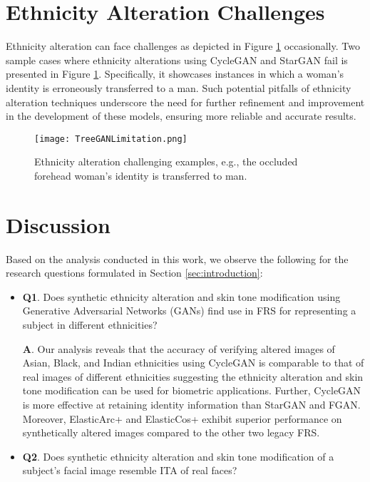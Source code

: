 {	



		

 

  

		



\section{Ethnicity Alteration Challenges}\label{sec:challenges}
Ethnicity alteration can face challenges as depicted in Figure \ref{fig:treeganlimitation} occasionally. Two sample cases where ethnicity alterations using CycleGAN and StarGAN fail is presented in Figure \ref{fig:treeganlimitation}. Specifically, it showcases instances in which a woman's identity is erroneously transferred to a man. Such potential pitfalls of ethnicity alteration techniques underscore the need for further refinement and improvement in the development of these models, ensuring more reliable and accurate results.

   
\begin{figure}[htp]
    \centering
    \texttt{[image: TreeGANLimitation.png]}
    \caption{Ethnicity alteration challenging examples, e.g., the occluded forehead woman’s identity is transferred to man.}
    \label{fig:treeganlimitation}
    \vspace*{-0.3cm}
\end{figure}

\section{Discussion}\label{sec:discussion} 
Based on the analysis conducted in this work, we observe the following for the research questions formulated in Section \ref{sec:introduction}:

\begin{itemize}[noitemsep]
    \item \textbf{Q1}. Does synthetic ethnicity alteration and skin tone modification using Generative Adversarial Networks (GANs) find use in FRS for representing a subject in different ethnicities?
    
    \textbf{A}. Our analysis reveals that the accuracy of verifying altered images of Asian, Black, and Indian ethnicities using CycleGAN is comparable to that of real images of different ethnicities suggesting the ethnicity alteration and skin tone modification can be used for biometric applications. Further, CycleGAN is more effective at retaining identity information than StarGAN and FGAN. Moreover, ElasticArc+ and ElasticCos+ exhibit superior performance on synthetically altered images compared to the other two legacy FRS.     
    \item \textbf{Q2}. Does synthetic ethnicity alteration and skin tone modification of a subject's facial image resemble ITA of real faces?


\end{itemize}}
